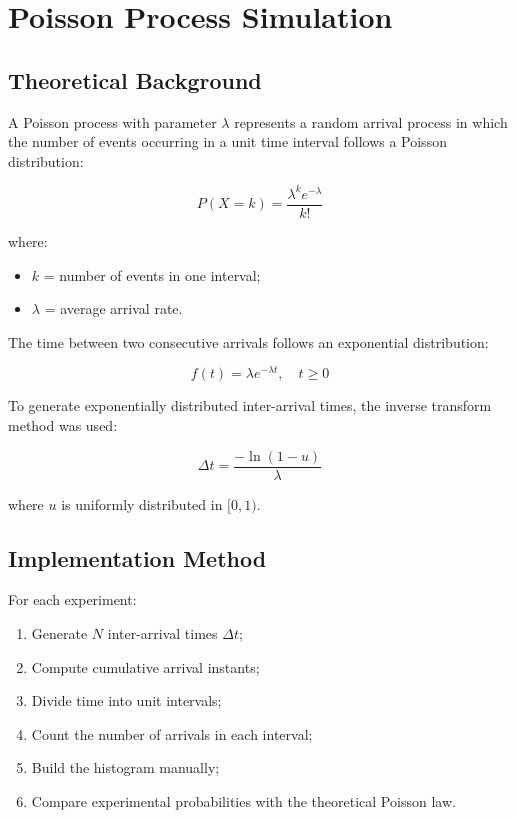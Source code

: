 \documentclass[12pt]{article}
\begin{document}
\section{Poisson Process Simulation}

\subsection{Theoretical Background}

A Poisson process with parameter $\lambda$ represents a random arrival process in which the number of events occurring in a unit time interval follows a Poisson distribution:

\begin{equation}
P(X=k)=\frac{\lambda^k e^{-\lambda}}{k!}
\end{equation}

where:

\begin{itemize}
    \item $k$ = number of events in one interval;
    \item $\lambda$ = average arrival rate.
\end{itemize}

The time between two consecutive arrivals follows an exponential distribution:

\begin{equation}
f(t)=\lambda e^{-\lambda t}, \quad t \geq 0
\end{equation}

To generate exponentially distributed inter-arrival times, the inverse transform method was used:

\begin{equation}
\Delta t = \frac{-\ln(1-u)}{\lambda}
\end{equation}

where $u$ is uniformly distributed in $[0,1)$.

\subsection{Implementation Method}

For each experiment:

\begin{enumerate}
    \item Generate $N$ inter-arrival times $\Delta t$;
    \item Compute cumulative arrival instants;
    \item Divide time into unit intervals;
    \item Count the number of arrivals in each interval;
    \item Build the histogram manually;
    \item Compare experimental probabilities with the theoretical Poisson law.
\end{enumerate}
\end{document}
